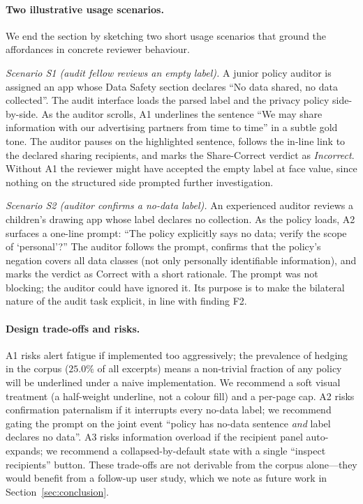 \documentclass[11pt,a4paper]{article}
\begin{document}
\paragraph{Two illustrative usage scenarios.}
We end the section by sketching two short usage scenarios that
ground the affordances in concrete reviewer behaviour.

\emph{Scenario S1 (audit fellow reviews an empty label).} A
junior policy auditor is assigned an app whose Data Safety section
declares ``No data shared, no data collected''. The audit interface
loads the parsed label and the privacy policy side-by-side. As the
auditor scrolls, A1 underlines the sentence ``We may share information
with our advertising partners from time to time'' in a subtle gold
tone. The auditor pauses on the highlighted sentence, follows the
in-line link to the declared sharing recipients, and marks the
Share-Correct verdict as \emph{Incorrect}. Without A1 the
reviewer might have accepted the empty label at face value, since
nothing on the structured side prompted further investigation.

\emph{Scenario S2 (auditor confirms a no-data label).} An
experienced auditor reviews a children's drawing app whose label
declares no collection. As the policy loads, A2 surfaces a one-line
prompt: ``The policy explicitly says no data; verify the scope of
`personal'?'' The auditor follows the prompt, confirms that the
policy's negation covers all data classes (not only personally
identifiable information), and marks the verdict as Correct with a
short rationale. The prompt was not blocking; the auditor could have
ignored it. Its purpose is to make the bilateral nature of the audit
task explicit, in line with finding F2.

\paragraph{Design trade-offs and risks.}
A1 risks alert fatigue if implemented too aggressively; the
prevalence of hedging in the corpus ($25.0\%$ of all excerpts) means
a non-trivial fraction of any policy will be underlined under a naive
implementation. We recommend a soft visual treatment (a half-weight
underline, not a colour fill) and a per-page cap. A2 risks
confirmation paternalism if it interrupts every no-data label; we
recommend gating the prompt on the joint event ``policy has no-data
sentence \emph{and} label declares no data''. A3 risks information
overload if the recipient panel auto-expands; we recommend a
collapsed-by-default state with a single ``inspect recipients'' button.
These trade-offs are not derivable from the corpus alone---they
would benefit from a follow-up user study, which we note as future
work in Section~\ref{sec:conclusion}.
\end{document}
